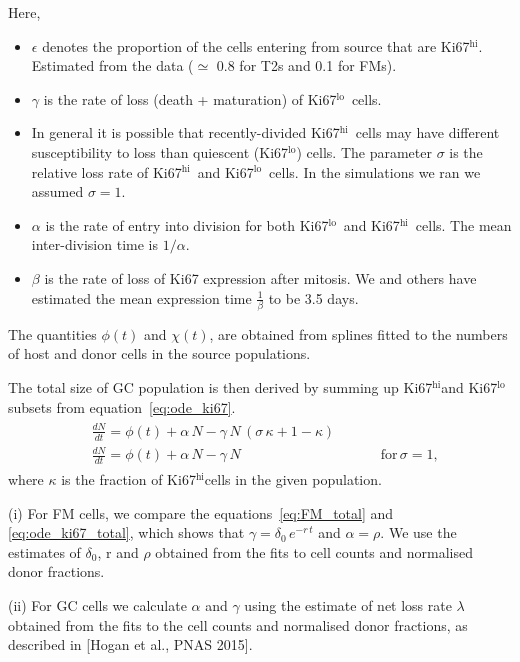 \documentclass[11pt]{article}
\newcommand{\bea}{\begin{eqnarray}}
\newcommand{\eea}{\end{eqnarray}}
\newcommand{\khi}{Ki67$^\text{hi}$}
\newcommand{\klo}{Ki67$^\text{lo}$}
\begin{document}
Here,
\begin{itemize}
\item $\epsilon$ denotes the proportion of the cells entering from source  that are \khi. Estimated from the data ($\simeq$ 0.8 for T2s and 0.1 for FMs).
\item $\gamma$ is the rate of loss (death + maturation) of \klo\ cells.
\item In general it is possible that recently-divided \khi\ cells may have different susceptibility to loss than quiescent (\klo) cells. The parameter $\sigma$ is the relative loss rate of \khi\ and \klo\ cells. In the simulations we ran we assumed $\sigma=1$.
\item $\alpha$ is the rate of entry into division for both \klo\ and \khi\ cells. The mean inter-division time is $1/\alpha$.
\item $\beta$ is the rate of loss of Ki67 expression after mitosis.  We and others have estimated the mean expression time $\frac{1}{\beta}$  to be 3.5 days. 
\end{itemize}

The quantities $\phi(t)$ and  $\chi(t)$, are obtained from splines fitted to the numbers of host and donor cells in the source populations.

The total size of GC population is then derived by summing up \khi and \klo subsets from equation~\ref{eq:ode_ki67}.
\bea
\begin{aligned}
&\frac{dN}{dt} =  \phi(t) + \alpha \, N -  \gamma \, N \, ( \sigma \, \kappa + 1 - \kappa)  \\
&\frac{dN}{dt} =  \phi(t) + \alpha \, N -  \gamma \, N   \qquad \qquad \qquad \qquad \qquad \text{for} \, \sigma = 1,
\end{aligned}
\label{eq:ode_ki67_total}
\eea
where $\kappa$ is the fraction of \khi cells in the given population.

(i) For FM cells, we compare the equations~\ref{eq:FM_total} and \ref{eq:ode_ki67_total}, which shows that $\gamma = \delta_0 \, e^{-r \, t}$ and $\alpha = \rho$. We use the estimates of $\delta_0$, r and $\rho$  obtained from the fits to cell counts and normalised donor fractions.

(ii) For GC cells we calculate $\alpha$ and $\gamma$ using the estimate of net loss rate $\lambda$ obtained from the fits to the cell counts and normalised donor fractions, as described in [Hogan et al., PNAS 2015].
\end{document}

